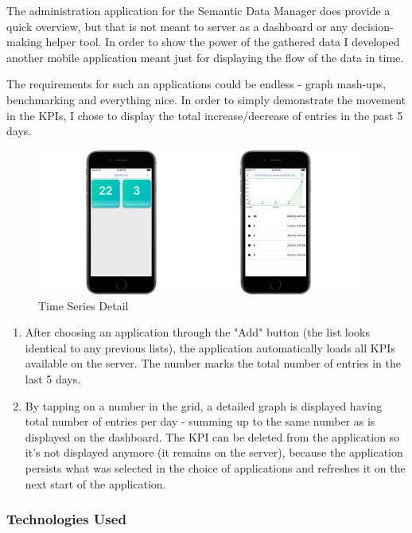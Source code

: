 The administration application for the Semantic Data Manager does provide a quick overview, but that is not meant to server as a dashboard or any decision-making helper tool. In order to show the power of the gathered data I developed another mobile application meant just for displaying the flow of the data in time.

The requirements for such an applications could be endless - graph mash-ups, benchmarking and everything nice. In order to simply demonstrate the movement in the KPIs, I chose to display the total increase/decrease of entries in the past 5 days.

\newpage

\begin{figure}[!ht]
	\centering
	\includegraphics[width=0.95\textwidth]{figures/04_implementation/time_flow}
    \caption{Time Series Detail}
\end{figure}

\begin{enumerate}
	\item After choosing an application through the "Add" button (the list looks identical to any previous lists), the application automatically loads all KPIs available on the server. The number marks the total number of entries in the last 5 days.
	\item By tapping on a number in the grid, a detailed graph is displayed having total number of entries per day - summing up to the same number as is displayed on the dashboard. The KPI can be deleted from the application so it's not displayed anymore (it remains on the server), because the application persists what was selected in the choice of applications and refreshes it on the next start of the application.
\end{enumerate}

\subsubsection{Technologies Used}

